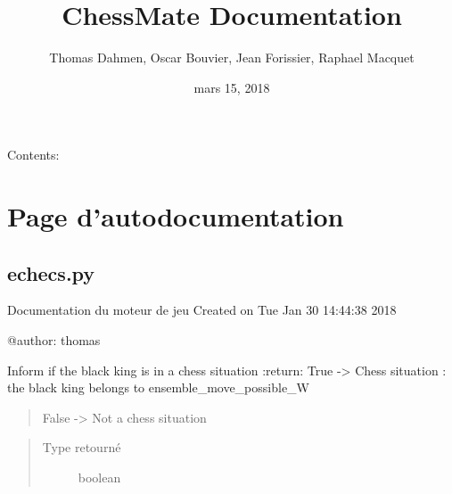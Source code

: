 \documentclass[letterpaper,10pt,french]{sphinxmanual}
\title{ChessMate Documentation}
\date{mars 15, 2018}
\author{Thomas Dahmen, Oscar Bouvier, Jean Forissier, Raphael Macquet}
\begin{document}
\maketitle
\sphinxtableofcontents
{}\label{\detokenize{index::doc}}


Contents:


\chapter{Page d’autodocumentation}
\label{\detokenize{autodoc:bienvenue-sur-cette-documentation}}\label{\detokenize{autodoc:page-d-autodocumentation}}\label{\detokenize{autodoc::doc}}

\section{echecs.py}
\label{\detokenize{autodoc:echecs-py}}
Documentation du moteur de jeu
\label{\detokenize{autodoc:module-echecs}}
Created on Tue Jan 30 14:44:38 2018

@author: thomas

\begin{fulllineitems}
\label{\detokenize{autodoc:echecs.alpha_beta_B}}
\end{fulllineitems}


\begin{fulllineitems}
\label{\detokenize{autodoc:echecs.alpha_beta_W}}
\end{fulllineitems}


\begin{fulllineitems}
\label{\detokenize{autodoc:echecs.chess_B}}
Inform if the black king is in a chess situation
:return: True -\textgreater{} Chess situation : the black king belongs to ensemble\_move\_possible\_W
\begin{quote}

False -\textgreater{} Not a chess situation
\end{quote}
\begin{quote}\begin{description}
\item[{Type retourné}] \leavevmode
boolean

\end{description}\end{quote}

\end{fulllineitems}
\end{document}

